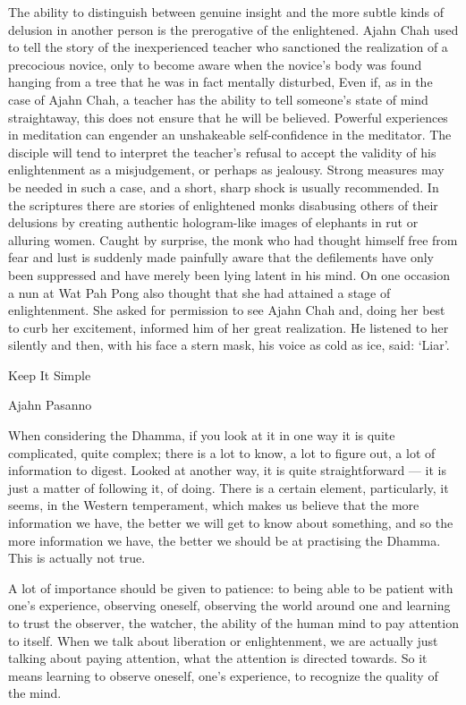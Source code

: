 The ability to distinguish between genuine insight and the more subtle
kinds of delusion in another person is the prerogative of the
enlightened. Ajahn Chah used to tell the story of the inexperienced
teacher who sanctioned the realization of a precocious novice, only to
become aware when the novice's body was found hanging from a tree that
he was in fact mentally disturbed, Even if, as in the case of Ajahn
Chah, a teacher has the ability to tell someone's state of mind
straightaway, this does not ensure that he will be believed. Powerful
experiences in meditation can engender an unshakeable self-confidence in
the meditator. The disciple will tend to interpret the teacher's refusal
to accept the validity of his enlightenment as a misjudgement, or
perhaps as jealousy. Strong measures may be needed in such a case, and a
short, sharp shock is usually recommended. In the scriptures there are
stories of enlightened monks disabusing others of their delusions by
creating authentic hologram-like images of elephants in rut or alluring
women. Caught by surprise, the monk who had thought himself free from
fear and lust is suddenly made painfully aware that the defilements have
only been suppressed and have merely been lying latent in his mind. On
one occasion a nun at Wat Pah Pong also thought that she had attained a
stage of enlightenment. She asked for permission to see Ajahn Chah and,
doing her best to curb her excitement, informed him of her great
realization. He listened to her silently and then, with his face a stern
mask, his voice as cold as ice, said: `Liar'.



Keep It Simple

Ajahn Pasanno

When considering the Dhamma, if you look at it in one way it is quite
complicated, quite complex; there is a lot to know, a lot to figure out,
a lot of information to digest. Looked at another way, it is quite
straightforward --- it is just a matter of following it, of doing. There
is a certain element, particularly, it seems, in the Western
temperament, which makes us believe that the more information we have,
the better we will get to know about something, and so the more
information we have, the better we should be at practising the Dhamma.
This is actually not true.

A lot of importance should be given to patience: to being able to be
patient with one's experience, observing oneself, observing the world
around one and learning to trust the observer, the watcher, the ability
of the human mind to pay attention to itself. When we talk about
liberation or enlightenment, we are actually just talking about paying
attention, what the attention is directed towards. So it means learning
to observe oneself, one's experience, to recognize the quality of the
mind.

